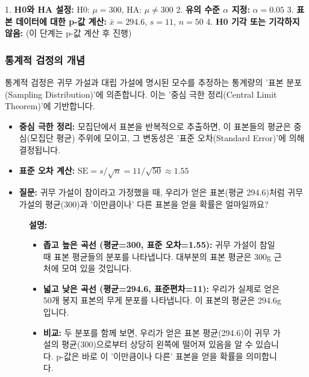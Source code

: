 \documentclass[11pt,a4paper]{article}
\theoremstyle{definition}
\begin{document}
1.  \textbf{H0와 HA 설정:} H0: $\mu = 300$, HA: $\mu \ne 300$
2.  \textbf{유의 수준 $\alpha$ 지정:} $\alpha = 0.05$
3.  \textbf{표본 데이터에 대한 p-값 계산:} $\bar{x} = 294.6$, $s = 11$, $n = 50$
4.  \textbf{H0 기각 또는 기각하지 않음:} (이 단계는 p-값 계산 후 진행)

\subsubsection*{통계적 검정의 개념}

통계적 검정은 귀무 가설과 대립 가설에 명시된 모수를 추정하는 통계량의 '표본 분포(Sampling Distribution)'에 의존합니다. 이는 '중심 극한 정리(Central Limit Theorem)'에 기반합니다.

\begin{itemize}
    \item \textbf{중심 극한 정리:} 모집단에서 표본을 반복적으로 추출하면, 이 표본들의 평균은 중심(모집단 평균) 주위에 모이고, 그 변동성은 '표준 오차(Standard Error)'에 의해 결정됩니다.
    \item \textbf{표준 오차 계산:} $\text{SE} = s / \sqrt{n} = 11 / \sqrt{50} \approx 1.55$
    \item \textbf{질문:} 귀무 가설이 참이라고 가정했을 때, 우리가 얻은 표본(평균 294.6)처럼 귀무 가설의 평균(300)과 '이만큼이나' 다른 표본을 얻을 확률은 얼마일까요?
\end{itemize}

\begin{figure}[h!]
    \centering
    \label{fig:sampling_distribution}
    \vspace{0.5em}
    \textbf{설명:}
    \begin{itemize}
        \item \textbf{좁고 높은 곡선 (평균=300, 표준 오차=1.55):} 귀무 가설이 참일 때 표본 평균들의 분포를 나타냅니다. 대부분의 표본 평균은 300g 근처에 모여 있을 것입니다.
        \item \textbf{넓고 낮은 곡선 (평균=294.6, 표준편차=11):} 우리가 실제로 얻은 50개 봉지 표본의 무게 분포를 나타냅니다. 이 표본의 평균은 294.6g입니다.
        \item \textbf{비교:} 두 분포를 함께 보면, 우리가 얻은 표본 평균(294.6)이 귀무 가설의 평균(300)으로부터 상당히 왼쪽에 떨어져 있음을 알 수 있습니다. p-값은 바로 이 '이만큼이나 다른' 표본을 얻을 확률을 의미합니다.
    \end{itemize}
\end{figure}
\end{document}
